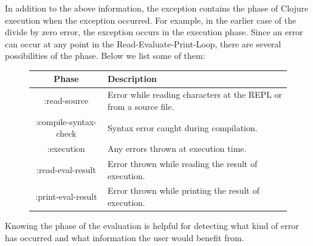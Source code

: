 \documentclass[12pt]{article}
\newcommand{\comment}[1]{{\bf \tt  {#1}}}
\newcommand{\tkcomment}[1]{\textcolor{Teal}{\comment{Tristan: {#1}}}}
\begin{document}

In addition to the above information, the exception contains the phase of Clojure execution when the exception occurred. For example, in the earlier case of the divide by zero error, the exception occurs in the execution phase. 
%
%
Since an error can occur at any point in the Read-Evaluate-Print-Loop, there are several possibilities of the phase. Below we list some of them:
	\begin{figure}[h]
		\centering
		\begin{tabular}{|c|l|}
			\hline
			\textbf{Phase} & \textbf{Description} \\
			\hline
			:read-source & Error while reading characters at the REPL or from a source file. \\
			:compile-syntax-check & Syntax error caught during compilation. \\
			:execution & Any errors thrown at execution time. \\
			:read-eval-result & Error thrown while reading the result of execution. \\
			:print-eval-result & Error thrown while printing the result of execution. \\
			\hline
		\end{tabular}
	\end{figure}
Knowing the phase of the evaluation is helpful for detecting what kind of error has occurred and what information the user would benefit from.
\end{document}
